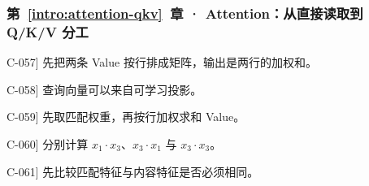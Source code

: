 \subsubsection*{第~\ref*{intro:attention-qkv}~章 · Attention：从直接读取到 Q/K/V 分工}
\begin{answerhints}
\item[\hyperref[exercise:weighted-value-read]{C-057}] \leavevmode{}\label{hint:weighted-value-read}先把两条 Value 按行排成矩阵，输出是两行的加权和。
\item[\hyperref[exercise:query-projection-choice]{C-058}] \leavevmode{}\label{hint:query-projection-choice}查询向量可以来自可学习投影。
\item[\hyperref[exercise:unnormalized-value-read]{C-059}] \leavevmode{}\label{hint:unnormalized-value-read}先取匹配权重，再按行加权求和 Value。
\item[\hyperref[exercise:self-dot-length]{C-060}] \leavevmode{}\label{hint:self-dot-length}分别计算 $x_1\cdot x_3$、$x_3\cdot x_1$ 与 $x_3\cdot x_3$。
\item[\hyperref[exercise:key-value-projections]{C-061}] \leavevmode{}\label{hint:key-value-projections}先比较匹配特征与内容特征是否必须相同。
\end{answerhints}
